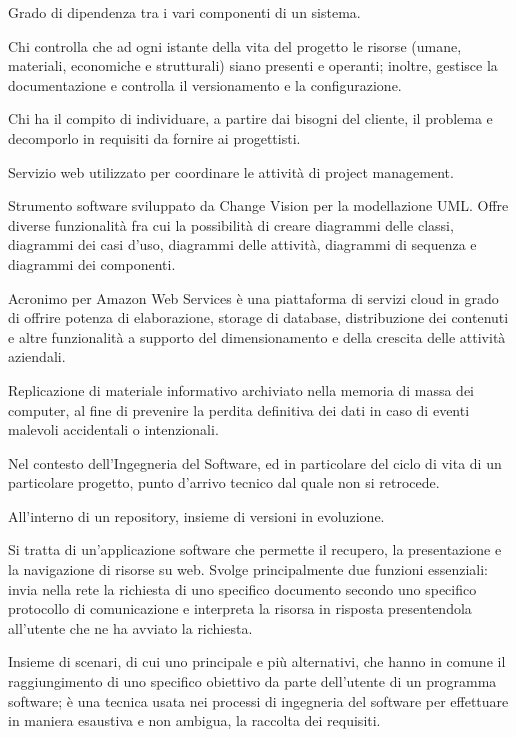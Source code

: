 \item[Accoppiamento] Grado di dipendenza tra i vari componenti di un sistema.
\item[Amministratore di progetto] Chi controlla che ad ogni istante della vita del progetto le risorse (umane, materiali, economiche e strutturali) siano presenti e operanti; inoltre, gestisce la documentazione e controlla il versionamento e la configurazione.
\item[Analista] Chi ha il compito di individuare, a partire dai bisogni del cliente, il problema e decomporlo in requisiti da fornire ai progettisti.
\item[Asana] Servizio web utilizzato per coordinare le attività di project management.
\item[Astah] Strumento software sviluppato da Change Vision per la modellazione UML. Offre diverse funzionalità fra cui la possibilità di creare diagrammi delle classi, diagrammi dei casi d’uso, diagrammi delle attività, diagrammi di sequenza e diagrammi dei componenti.
\item[AWS] Acronimo per Amazon Web Services è una piattaforma di servizi cloud in grado di offrire potenza di elaborazione, storage di database, distribuzione dei contenuti e altre funzionalità a supporto del dimensionamento e della crescita delle attività aziendali.
\item[Backup] Replicazione di materiale informativo archiviato nella memoria di massa dei computer, al fine di prevenire la perdita definitiva dei dati in caso di eventi malevoli accidentali o intenzionali.
\item[Baseline] Nel contesto dell'Ingegneria del Software, ed in particolare del ciclo di vita di un particolare progetto, punto d'arrivo tecnico dal quale non si retrocede.
\item[Branch] All'interno di un repository, insieme di versioni in evoluzione.
\item[Browser] Si tratta di un’applicazione software che permette il recupero, la presentazione e la navigazione di risorse su web. Svolge principalmente due funzioni essenziali: invia nella rete la richiesta di uno specifico documento secondo uno specifico protocollo di comunicazione e interpreta la risorsa in risposta presentendola all’utente che ne ha avviato la richiesta.
\item[Caso d'uso] Insieme di scenari, di cui uno principale e più alternativi, che hanno in comune il raggiungimento di uno specifico obiettivo da parte dell'utente di un programma software; è una tecnica usata nei processi di ingegneria del software per effettuare in maniera esaustiva e non ambigua, la raccolta dei requisiti.
